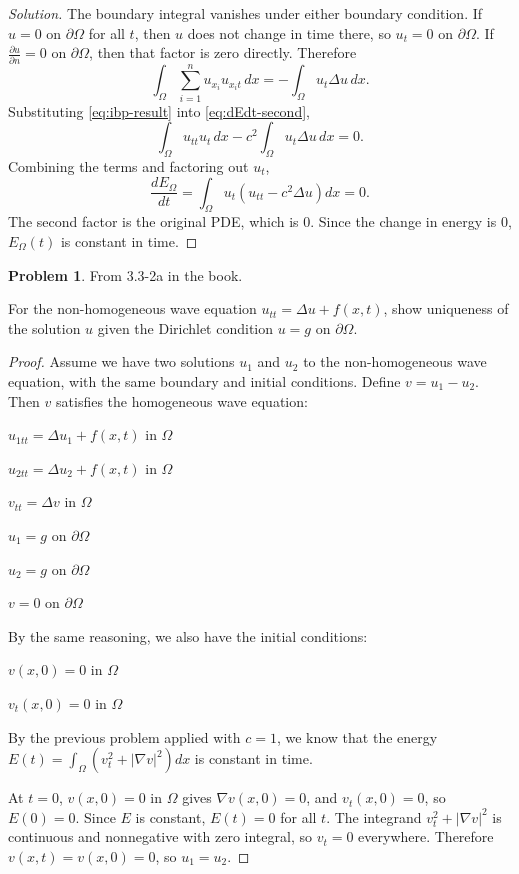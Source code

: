 \documentclass[11pt]{article}
\newcommand{\pd}[2]{\frac{\partial #1}{\partial #2}}
\newcommand{\lap}{\Delta}
\newcommand{\grad}{\nabla}
\theoremstyle{definition}
\newtheorem{problem}{Problem}
\begin{document}
\begin{proof}[Solution]
The boundary integral vanishes under either boundary condition. If $u = 0$ on
$\partial\Omega$ for all $t$, then $u$ does not change in time there, so
$u_t = 0$ on $\partial\Omega$. If $\pd{u}{n} = 0$ on $\partial\Omega$, then
that factor is zero directly. Therefore
\begin{equation} \label{eq:ibp-result}
\int_\Omega \sum_{i=1}^n u_{x_i} u_{x_i t} \, dx
  = -\int_\Omega u_t \lap u \, dx.
\end{equation}
Substituting \eqref{eq:ibp-result} into \eqref{eq:dEdt-second},
\begin{equation} \label{eq:dEdt-lap}
\int_\Omega u_{tt} u_t \, dx - c^2 \int_\Omega u_t \lap u \, dx = 0.
\end{equation}
Combining the terms and factoring out $u_t$,
\begin{equation} \label{eq:dEdt-factored}
\frac{dE_\Omega}{dt}
  = \int_\Omega u_t \left( u_{tt} - c^2 \lap u \right) dx = 0.
\end{equation}
The second factor is the original PDE, which is 0. Since the change in energy
is 0, $E_\Omega(t)$ is constant in time.
\end{proof}

\begin{problem}
From 3.3-2a in the book.

For the non-homogeneous wave equation $u_{tt} = \lap u + f(x,t)$,
show uniqueness of the solution $u$ given the Dirichlet condition $u = g$ on $\partial \Omega$.
\end{problem}

\begin{proof}
    Assume we have two solutions $u_1$ and $u_2$ to the non-homogeneous wave equation, with the same boundary and initial conditions. Define $v = u_1 - u_2$. Then $v$ satisfies the homogeneous wave equation:   

$u_{1tt} = \lap u_1 + f(x,t)$ in $\Omega$

$u_{2tt} = \lap u_2 + f(x,t)$ in $\Omega$

$v_{tt} = \lap v$ in $\Omega$

$u_1 = g$ on $\partial \Omega$

$u_2 = g$ on $\partial \Omega$

$v = 0$ on $\partial \Omega$

By the same reasoning, we also have the initial conditions:

$v(x,0) = 0$ in $\Omega$

$v_t(x,0) = 0$ in $\Omega$

By the previous problem applied with $c=1$, we know that the energy $E(t) = \int_\Omega (v_t^2 + |\grad v|^2) dx$ is constant in time.

At $t = 0$, $v(x,0) = 0$ in $\Omega$ gives $\grad v(x,0) = 0$, and
$v_t(x,0) = 0$, so $E(0) = 0$. Since $E$ is constant, $E(t) = 0$ for all $t$.
The integrand $v_t^2 + |\grad v|^2$ is continuous and nonnegative with zero
integral, so $v_t = 0$ everywhere. Therefore $v(x,t) = v(x,0) = 0$, so
$u_1 = u_2$.
\end{proof}
\end{document}

